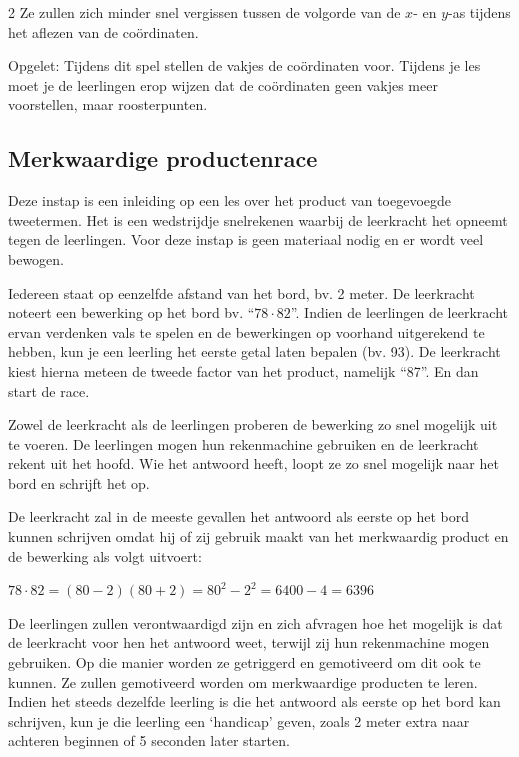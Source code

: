 \begin{multicols} {2}
Ze zullen zich minder snel vergissen tussen de volgorde van de $x$- en $y$-as tijdens het aflezen van de coördinaten. 

Opgelet: Tijdens dit spel stellen de vakjes de coördinaten voor. Tijdens je les moet je de leerlingen erop wijzen dat de coördinaten geen vakjes meer voorstellen, maar roosterpunten.

\subsection{Merkwaardige productenrace}
Deze instap is een inleiding op een les over het product van toegevoegde tweetermen. Het is een wedstrijdje snelrekenen waarbij de leerkracht het opneemt tegen de leerlingen. Voor deze instap is geen materiaal nodig en er wordt veel bewogen.

Iedereen staat op eenzelfde afstand van het bord, bv. 2 meter. De leerkracht noteert een bewerking op het bord bv. “$78 \cdot 82$”. Indien de leerlingen de leerkracht ervan verdenken vals te spelen en de bewerkingen op voorhand uitgerekend te hebben, kun je een leerling het eerste getal laten bepalen (bv. 93). De leerkracht kiest hierna meteen de tweede factor van het product, namelijk “87”. En dan start de race.

Zowel de leerkracht als de leerlingen proberen de bewerking zo snel mogelijk uit te voeren. De leerlingen mogen hun rekenmachine gebruiken en de leerkracht rekent uit het hoofd. Wie het antwoord heeft, loopt ze zo snel mogelijk naar het bord en schrijft het op.

De leerkracht zal in de meeste gevallen het antwoord als eerste op het bord kunnen schrijven omdat hij of zij gebruik maakt van het merkwaardig product en de bewerking als volgt uitvoert: 

$78 \cdot 82 = (80 - 2)(80 + 2) = 80^2 - 2^2 = 6400 - 4 = 6396$

De leerlingen zullen verontwaardigd zijn en zich afvragen hoe het mogelijk is dat de leerkracht voor hen het antwoord weet, terwijl zij hun rekenmachine mogen gebruiken. Op die manier worden ze getriggerd en gemotiveerd om dit ook te kunnen. Ze zullen gemotiveerd worden om merkwaardige producten te leren.
Indien het steeds dezelfde leerling is die het antwoord als eerste op het bord kan schrijven, kun je die leerling een ‘handicap’ geven, zoals 2 meter extra naar achteren beginnen of 5 seconden later starten.


\end{multicols}
